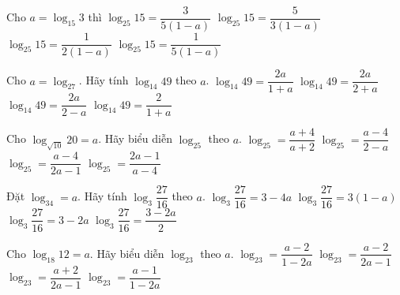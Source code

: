 \begin{ex}%
	Cho $a=\log_{15}3$ thì
	\choice
	{$\log_{25}15=\dfrac{3}{5(1-a)}$}
	{$\log_{25}15=\dfrac{5}{3(1-a)}$}
	{\True $\log_{25}15=\dfrac{1}{2(1-a)}$}
	{$\log_{25}15=\dfrac{1}{5(1-a)}$}
\end{ex}

\begin{ex}%
	Cho $a=\log_27$. Hãy tính $\log_{14}49$ theo $a$.
	\choice
	{\True $\log_{14}49=\dfrac{2a}{1+a}$}
	{$\log_{14}49=\dfrac{2a}{2+a}$}
	{$\log_{14}49=\dfrac{2a}{2-a}$}
	{$\log_{14}49=\dfrac{2}{1+a}$}
\end{ex}

\begin{ex}%
	Cho $\log_{\sqrt{10}}20=a$. Hãy biểu diễn $\log_25$ theo $a$.
	\choice
	{$\log_25=\dfrac{a+4}{a+2}$}
	{\True $\log_25=\dfrac{a-4}{2-a}$}
	{$\log_25=\dfrac{a-4}{2a-1}$}
	{$\log_25=\dfrac{2a-1}{a-4}$}
\end{ex}

\begin{ex}%
	Đặt $\log_34=a$. Hãy tính $\log_3\dfrac{27}{16}$ theo $a$.
	\choice
	{$\log_3\dfrac{27}{16}=3-4a$}
	{$\log_3\dfrac{27}{16}=3(1-a)$}
	{\True $\log_3\dfrac{27}{16}=3-2a$}
	{$\log_3\dfrac{27}{16}=\dfrac{3-2a}{2}$}
\end{ex}

\begin{ex}%
	Cho $\log_{18}12=a$. Hãy biểu diễn $\log_23$ theo $a$.
	\choice
	{\True $\log_23=\dfrac{a-2}{1-2a}$}
	{$\log_23=\dfrac{a-2}{2a-1}$}
	{$\log_23=\dfrac{a+2}{2a-1}$}
	{$\log_23=\dfrac{a-1}{1-2a}$}
\end{ex}

